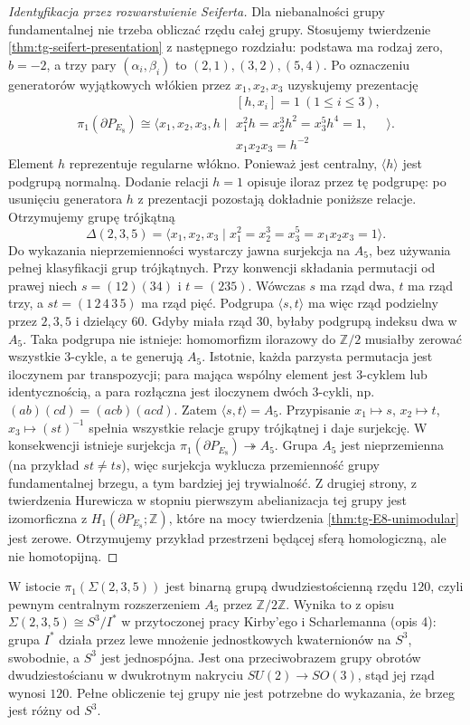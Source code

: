 \begin{proof}[Identyfikacja przez rozwarstwienie Seiferta]
Dla niebanalności grupy fundamentalnej nie trzeba
obliczać rzędu całej grupy. Stosujemy twierdzenie
\ref{thm:tg-seifert-presentation} z następnego rozdziału:
podstawa ma rodzaj zero, $b=-2$, a trzy pary
$(\alpha_i,\beta_i)$ to $(2,1),(3,2),(5,4)$.
Po oznaczeniu generatorów wyjątkowych włókien
przez $x_1,x_2,x_3$ uzyskujemy prezentację
\[
\pi_1(\partial P_{E_8})\cong
\big\langle x_1,x_2,x_3,h\mid
\begin{array}{l}
[h,x_i]=1\ (1\le i\le3),\\
x_1^2h=x_2^3h^2=x_3^5h^4=1,\\
x_1x_2x_3=h^{-2}
\end{array}
\big\rangle.
\]
Element $h$ reprezentuje regularne włókno.
Ponieważ jest centralny, $\langle h\rangle$ jest
podgrupą normalną. Dodanie relacji $h=1$ opisuje
iloraz przez tę podgrupę: po usunięciu generatora
$h$ z prezentacji pozostają dokładnie poniższe
relacje. Otrzymujemy grupę trójkątną
\[
\Delta(2,3,5)=\langle x_1,x_2,x_3\mid
x_1^2=x_2^3=x_3^5=x_1x_2x_3=1\rangle.
\]
Do wykazania nieprzemienności wystarczy
jawna surjekcja na $A_5$, bez używania pełnej
klasyfikacji grup trójkątnych.
Przy konwencji składania permutacji od prawej
niech $s=(12)(34)$ i $t=(235)$.
Wówczas $s$ ma rząd dwa, $t$ ma rząd trzy,
a $st=(1\,2\,4\,3\,5)$ ma rząd pięć.
Podgrupa $\langle s,t\rangle$ ma więc rząd
podzielny przez $2,3,5$ i dzielący $60$.
Gdyby miała rząd $30$, byłaby podgrupą
indeksu dwa w $A_5$. Taka podgrupa nie istnieje:
homomorfizm ilorazowy do $\mathbb Z/2$
musiałby zerować wszystkie 3-cykle, a te
generują $A_5$. Istotnie, każda parzysta
permutacja jest iloczynem par transpozycji;
para mająca wspólny element jest 3-cyklem
lub identycznością, a para rozłączna jest
iloczynem dwóch 3-cykli, np.
$(ab)(cd)=(acb)(acd)$.
Zatem $\langle s,t\rangle=A_5$.
Przypisanie $x_1\mapsto s$, $x_2\mapsto t$,
$x_3\mapsto(st)^{-1}$ spełnia wszystkie
relacje grupy trójkątnej i daje surjekcję.
W konsekwencji istnieje surjekcja
$\pi_1(\partial P_{E_8})\twoheadrightarrow A_5$.
Grupa $A_5$ jest nieprzemienna (na przykład
$st\ne ts$), więc surjekcja wyklucza przemienność
grupy fundamentalnej brzegu, a tym bardziej jej
trywialność. Z drugiej strony, z twierdzenia
Hurewicza w stopniu pierwszym abelianizacja
tej grupy jest izomorficzna z $H_1(\partial P_{E_8};\mathbb Z)$,
które na mocy twierdzenia \ref{thm:tg-E8-unimodular}
jest zerowe. Otrzymujemy przykład przestrzeni będącej
sferą homologiczną, ale nie homotopijną.
\end{proof}

\begin{uwaga}
W istocie $\pi_1(\Sigma(2,3,5))$ jest binarną grupą
dwudziestościenną rzędu $120$, czyli pewnym centralnym
rozszerzeniem $A_5$ przez $\mathbb Z/2\mathbb Z$.
Wynika to z opisu $\Sigma(2,3,5)\cong S^3/I^*$
w przytoczonej pracy Kirby'ego i Scharlemanna
(opis 4): grupa $I^*$ działa przez lewe
mnożenie jednostkowych kwaternionów na $S^3$,
swobodnie, a $S^3$ jest jednospójna.
Jest ona przeciwobrazem grupy obrotów
dwudziestościanu w dwukrotnym nakryciu
$SU(2)\to SO(3)$, stąd jej rząd wynosi $120$.
Pełne obliczenie tej grupy nie jest potrzebne do
wykazania, że brzeg jest różny od $S^3$.
\end{uwaga}

